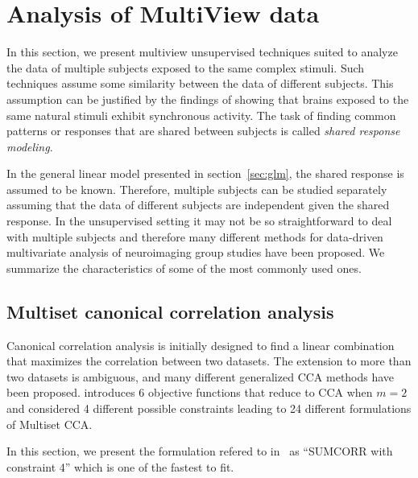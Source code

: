\section{Analysis of MultiView data}
In this section, we present multiview unsupervised techniques suited to
analyze the data of multiple subjects exposed to the same complex stimuli. Such
techniques assume some similarity between the data of different subjects. This
assumption can be justified by the findings of \cite{hasson2004intersubject} showing that brains exposed to the same natural stimuli exhibit synchronous activity.
The task of finding common patterns or responses that are shared between
subjects is called \emph{shared response modeling}.

In the general linear model presented in
section~\ref{sec:glm}, the shared response is assumed to be known. Therefore,
multiple subjects can be studied separately assuming that the data of different
subjects are independent given the shared response.
In the unsupervised setting it may not be so straightforward to deal with
multiple subjects and therefore many different
methods for data-driven multivariate analysis of neuroimaging group studies
have been proposed.
We summarize the characteristics of some of the most commonly used ones.


\subsection{Multiset canonical correlation analysis}
\label{sec:mcca}
Canonical correlation analysis is initially designed to find a linear
combination that maximizes the correlation between two datasets.
The extension to more than two datasets is ambiguous, and many
different generalized CCA methods have been proposed. \cite{kettenring1971canonical} introduces 6 objective functions that reduce to CCA when $m=2$ and \cite{nielsen2002multiset} considered 4 different possible constraints leading to 24 different formulations of Multiset CCA.


In this section, we present the formulation refered to
in~\cite{nielsen2002multiset} as ``SUMCORR with constraint 4'' which is one of the
fastest to fit.

